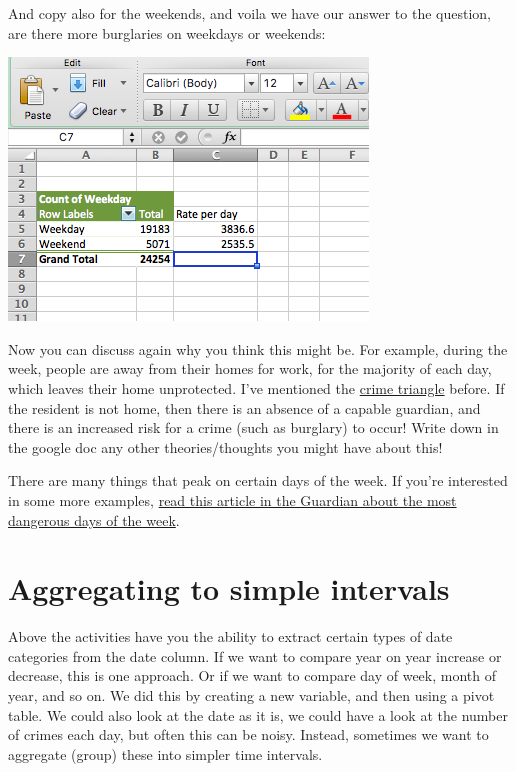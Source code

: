 \documentclass[
]{book}
\begin{document}
And copy also for the weekends, and voila we have our answer to the question, are there more burglaries on weekdays or weekends:

\includegraphics{imgs/burg_2.png}

Now you can discuss again why you think this might be. For example, during the week, people are away from their homes for work, for the majority of each day, which leaves their home unprotected. I've mentioned the \href{https://popcenter.asu.edu/content/problem-analysis-triangle-0}{crime triangle} before. If the resident is not home, then there is an absence of a capable guardian, and there is an increased risk for a crime (such as burglary) to occur! Write down in the google doc any other theories/thoughts you might have about this!

There are many things that peak on certain days of the week. If you're interested in some more examples, \href{https://www.theguardian.com/lifeandstyle/2013/may/29/most-dangerous-day-of-week}{read this article in the Guardian about the most dangerous days of the week}.

\hypertarget{aggregating-to-simple-intervals}{%
\section{Aggregating to simple intervals}\label{aggregating-to-simple-intervals}}

Above the activities have you the ability to extract certain types of date categories from the date column. If we want to compare year on year increase or decrease, this is one approach. Or if we want to compare day of week, month of year, and so on. We did this by creating a new variable, and then using a pivot table. We could also look at the date as it is, we could have a look at the number of crimes each day, but often this can be noisy. Instead, sometimes we want to aggregate (group) these into simpler time intervals.
\end{document}
